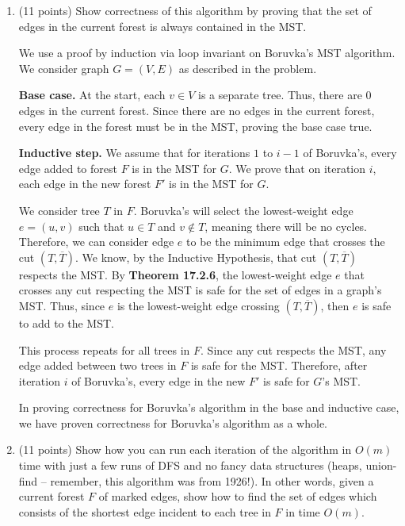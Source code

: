\documentclass[11pt]{article}
\begin{document}
\begin{enumerate}[resume]
\item (11 points) Show correctness of this algorithm by proving that the set of edges in the current forest is always contained in the MST.

We use a proof by induction via loop invariant on Boruvka's MST algorithm. 
We consider graph $G = (V, E)$ as described in the problem.

\textbf{Base case.} 
At the start, each $v \in V$ is a separate tree. Thus, there are $0$ edges in the current forest. 
Since there are no edges in the current forest, every edge in the forest must be in the MST, proving the base case true.

\textbf{Inductive step.} 
We assume that for iterations $1$ to $i-1$ of Boruvka's, every edge added to forest $F$ is in the MST for $G$. 
We prove that on iteration $i$, each edge in the new forest $F'$ is in the MST for $G$.

We consider tree $T$ in $F$. Boruvka's will select the lowest-weight edge $e = (u, v)$ such that $u \in T$ and $v \notin T$, 
meaning there will be no cycles. Therefore, we can consider edge $e$ to be the minimum edge that crosses the cut $(T, \overline{T})$. 
We know, by the Inductive Hypothesis, that cut $(T, \overline{T})$ respects the MST. 
By \textbf{Theorem 17.2.6}, the lowest-weight edge $e$ that crosses any cut respecting the MST is safe for the set of edges in a graph's MST. 
Thus, since $e$ is the lowest-weight edge crossing $(T, \overline{T})$, then $e$ is safe to add to the MST. 

This process repeats for all trees in $F$. Since any cut respects the MST, any edge added between two trees in $F$ is safe for the MST. 
Therefore, after iteration $i$ of Boruvka's, every edge in the new $F'$ is safe for $G$'s MST.

In proving correctness for Boruvka's algorithm in the base and inductive case, we have proven correctness for Boruvka's algorithm as a whole.

\bigbreak

\item  (11 points) Show how you can run each iteration of the algorithm in $O(m)$ time with just a few runs of DFS and no fancy data structures 
(heaps, union-find -- remember, this algorithm was from 1926!).  In other words, given a current forest $F$ of marked edges, 
show how to find the set of edges which consists of the shortest edge incident to each tree in $F$ in time $O(m)$.


\end{enumerate}
\end{document}
